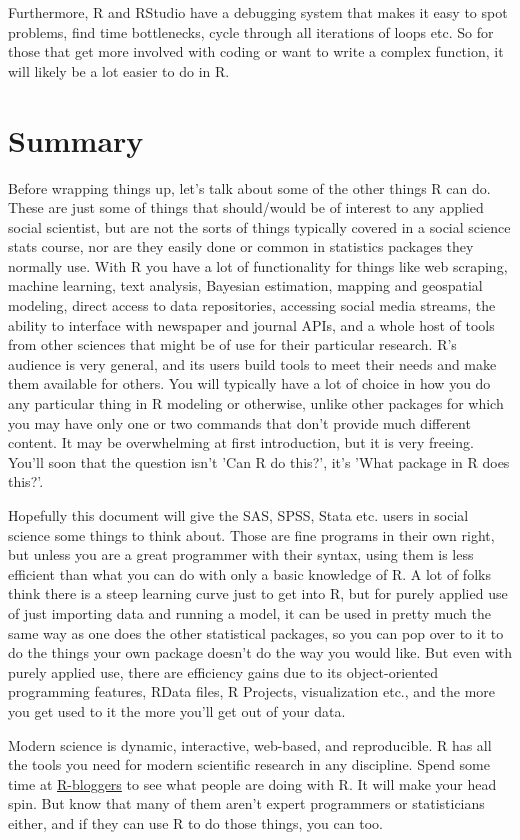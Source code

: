 \documentclass[english,nohyper,titlepage]{tufte-handout}\usepackage[]{graphicx}\usepackage[]{color}
\begin{document}
Furthermore, R and RStudio have a debugging system that makes it easy to spot problems, find time bottlenecks, cycle through all iterations of loops etc.  So for those that get more involved with coding or want to write a complex function, it will likely be a lot easier to do in R.





\part{Summary}
Before wrapping things up, let's talk about some of the other things R can do.  These are just some of things that should/would be of interest to any applied social scientist, but are not the sorts of things typically covered in a social science stats course, nor are they easily done or common in statistics packages they normally use.  With R you have a lot of functionality for things like web scraping, machine learning, text analysis, Bayesian estimation, mapping and geospatial modeling, direct access to data repositories, accessing social media streams, the ability to interface with newspaper and journal APIs, and a whole host of tools from other sciences that might be of use for their particular research.  R's audience is very general, and its users build tools to meet their needs and make them available for others.  You will typically have a lot of choice in how you do any particular thing in R modeling or otherwise, unlike other packages for which you may have only one or two commands that don't provide much different content.  It may be overwhelming at first introduction, but it is very freeing.  You'll soon that the question isn't 'Can R do this?', it's 'What package in R does this?'.


Hopefully this document will give the SAS, SPSS, Stata etc. users in social science some things to think about.  Those are fine programs in their own right, but unless you are a great programmer with their syntax, using them is less efficient than what you can do with only a basic knowledge of R.  A lot of folks think there is a steep learning curve just to get into R, but for purely applied use of just importing data and running a model, it can be used in pretty much the same way as one does the other statistical packages, so you can pop over to it to do the things your own package doesn't do the way you would like.  But even with purely applied use, there are efficiency gains due to its object-oriented programming features, RData files, R Projects, visualization etc., and the more you get used to it the more you'll get out of your data.  

Modern science is dynamic, interactive, web-based, and reproducible.  R has all the tools you need for modern scientific research in any discipline.  Spend some time at \href{http://www.r-bloggers.com/}{R-bloggers} to see what people are doing with R.  It will make your head spin.  But know that many of them aren't expert programmers or statisticians either, and if they can use R to do those things, you can too.  
\end{document}
